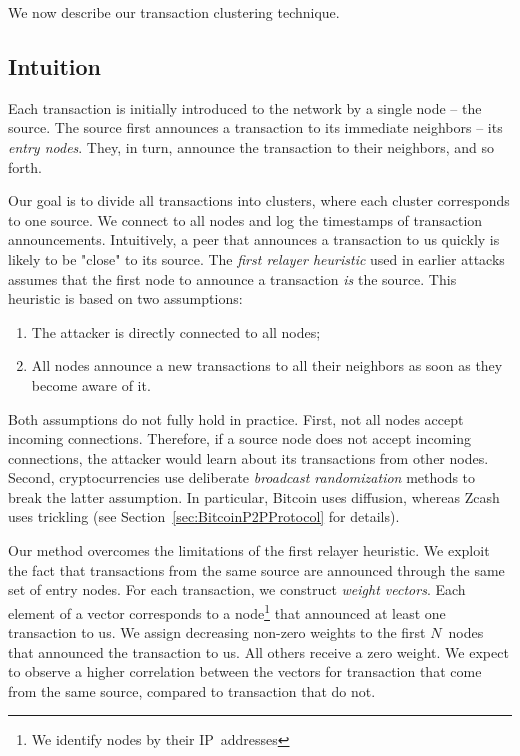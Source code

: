 We now describe our transaction clustering technique.

\subsection{Intuition}

Each transaction is initially introduced to the network by a single node -- the source.
The source first announces a transaction to its immediate neighbors -- its \textit{entry nodes}.
They, in turn, announce the transaction to their neighbors, and so forth.

Our goal is to divide all transactions into clusters, where each cluster corresponds to one source.
We connect to all nodes and log the timestamps of transaction announcements.
Intuitively, a peer that announces a transaction to us quickly is likely to be "close" to its source.
The \textit{first relayer heuristic} used in earlier attacks assumes that the first node to announce a transaction \textit{is} the source.
This heuristic is based on two assumptions:
\begin{enumerate}
	\item The attacker is directly connected to all nodes;
	\item All nodes announce a new transactions to all their neighbors as soon as they become aware of it.
\end{enumerate}
Both assumptions do not fully hold in practice.
First, not all nodes accept incoming connections.
Therefore, if a source node does not accept incoming connections, the attacker would learn about its transactions from other nodes.
Second, cryptocurrencies use deliberate \textit{broadcast randomization} methods to break the latter assumption.
In particular, Bitcoin uses diffusion, whereas Zcash uses trickling (see Section~\ref{sec:BitcoinP2PProtocol} for details).

Our method overcomes the limitations of the first relayer heuristic.
We exploit the fact that transactions from the same source are announced through the same set of entry nodes.
For each transaction, we construct \textit{weight vectors}.
Each element of a vector corresponds to a node\footnote{We identify nodes by their IP~addresses} that announced at least one transaction to us.
We assign decreasing non-zero weights to the first $N$~nodes that announced the transaction to us.
All others receive a zero weight.
We expect to observe a higher correlation between the vectors for transaction that come from the same source, compared to transaction that do not.

